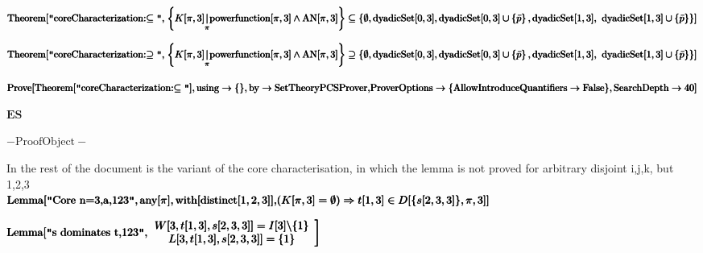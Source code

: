 \documentclass{article}
\begin{document}
\noindent\(\pmb{\text{Theorem}[\text{$\texttt{"}$coreCharacterization:$\subseteq \texttt{"}$},}\\
\pmb{\left\{K[\pi ,3]\underset{\pi }{|}\text{powerfunction}[\pi ,3]\land \text{AN}[\pi ,3]\right\}\subseteq }\\
\pmb{\left\{\emptyset ,\text{dyadicSet}[0,3],\text{dyadicSet}[0,3]\cup \left\{\bar{p}\right\},\text{dyadicSet}[1,3],\right.}\\
\pmb{\left.\left.\text{dyadicSet}[1,3]\cup \left\{\bar{p}\right\}\right\}\right]}\)

\noindent\(\pmb{\text{Theorem}[\text{$\texttt{"}$coreCharacterization:$\supseteq \texttt{"}$},}\\
\pmb{\left\{K[\pi ,3]\underset{\pi }{|}\text{powerfunction}[\pi ,3]\land \text{AN}[\pi ,3]\right\}\supseteq }\\
\pmb{\left\{\emptyset ,\text{dyadicSet}[0,3],\text{dyadicSet}[0,3]\cup \left\{\bar{p}\right\},\text{dyadicSet}[1,3],\right.}\\
\pmb{\left.\left.\text{dyadicSet}[1,3]\cup \left\{\bar{p}\right\}\right\}\right]}\)

\noindent\(\pmb{\text{Prove}[\text{Theorem}[\text{$\texttt{"}$coreCharacterization:$\subseteq \texttt{"}$}],\text{using}\to \{\},\text{by}\to \text{SetTheoryPCSProver},}\\
\pmb{\text{ProverOptions}\to \{\text{AllowIntroduceQuantifiers}\to \text{False}\},\text{SearchDepth}\to 40]}\)

\noindent\(\pmb{\text{ES}}\)

\noindent\(- \text{ProofObject} -\)

In the rest of the document is the variant of the core characterisation, in which the lemma is not proved for arbitrary disjoint i,j,k, but 1,2,3\\


\noindent\(\pmb{\text{Lemma}[\text{$\texttt{"}$Core n=3,a,123$\texttt{"}$}, \text{any}[\pi ],\text{with}[\text{distinct}[1,2,3]],}\\
\pmb{(K[\pi ,3]=\emptyset ) \Rightarrow  t[1,3]\in  D[\{s[2,3,3]\},\pi ,3]]}\)

\noindent\(\pmb{\text{Lemma}[\text{$\texttt{"}$s dominates t,123$\texttt{"}$},}\\
\pmb{\left.
\begin{array}{c}
 W[3,t[1,3],s[2,3,3]]=I[3]\backslash \{1\} \\
 L[3,t[1,3],s[2,3,3]]=\{1\}
\end{array}
\right]}\)
\end{document}
